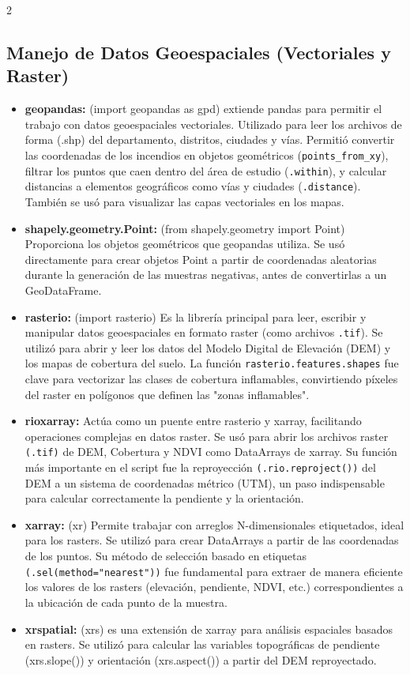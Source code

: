 \documentclass[a4paper,10pt]{article}
\begin{document}
\begin{multicols}{2}
\subsection{Manejo de Datos Geoespaciales (Vectoriales y Raster)}
\begin{itemize}
    \item \textbf{geopandas:} (import geopandas as gpd) extiende pandas para permitir el trabajo con datos geoespaciales vectoriales. Utilizado para leer los archivos de forma (.shp) del departamento, distritos, ciudades y vías. Permitió convertir las coordenadas de los incendios en objetos geométricos (\texttt{points\_from\_xy}), filtrar los puntos que caen dentro del área de estudio (\texttt{.within}), y calcular distancias a elementos geográficos como vías y ciudades (\texttt{.distance}). También se usó para visualizar las capas vectoriales en los mapas.
    \item \textbf{shapely.geometry.Point:} (from shapely.geometry import Point) Proporciona los objetos geométricos que geopandas utiliza. Se usó directamente para crear objetos Point a partir de coordenadas aleatorias durante la generación de las muestras negativas, antes de convertirlas a un GeoDataFrame.
    \item \textbf{rasterio:} (import rasterio) Es la librería principal para leer, escribir y manipular datos geoespaciales en formato raster (como archivos \texttt{.tif}). Se utilizó para abrir y leer los datos del Modelo Digital de Elevación (DEM) y los mapas de cobertura del suelo. La función \texttt{rasterio.features.shapes} fue clave para vectorizar las clases de cobertura inflamables, convirtiendo píxeles del raster en polígonos que definen las "zonas inflamables".
    \item \textbf{rioxarray:} Actúa como un puente entre rasterio y xarray, facilitando operaciones complejas en datos raster. Se usó para abrir los archivos raster \texttt{(.tif)} de DEM, Cobertura y NDVI como DataArrays de xarray. Su función más importante en el script fue la reproyección \texttt{(.rio.reproject())} del DEM a un sistema de coordenadas métrico (UTM), un paso indispensable para calcular correctamente la pendiente y la orientación.
    \item \textbf{xarray:} (xr) Permite trabajar con arreglos N-dimensionales etiquetados, ideal para los rasters. Se utilizó para crear DataArrays a partir de las coordenadas de los puntos. Su método de selección basado en etiquetas \texttt{(.sel(method="nearest"))} fue fundamental para extraer de manera eficiente los valores de los rasters (elevación, pendiente, NDVI, etc.) correspondientes a la ubicación de cada punto de la muestra.
    \item \textbf{xrspatial:} (xrs) es una extensión de xarray para análisis espaciales basados en rasters. Se utilizó para calcular las variables topográficas de pendiente (xrs.slope()) y orientación (xrs.aspect()) a partir del DEM reproyectado.
\end{itemize}

\end{multicols}
\end{document}
